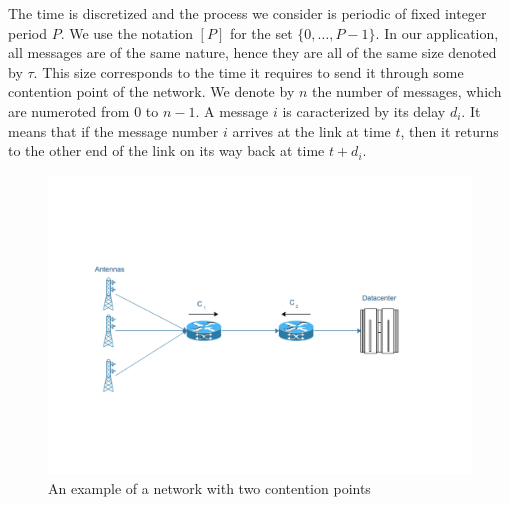 \documentclass[10pt, conference, letterpaper]{IEEEtran}
\begin{document}
The time is discretized and the process we consider is periodic of fixed integer period $P$. We use the notation $[P]$ for the set $\{0,\dots,P-1\}$. In our application, all messages are of the same nature, hence they are all of the same size denoted by $\tau$. This size corresponds to the time it requires to send it through some contention point of the network.
We denote by $n$ the number of messages, which are numeroted from $0$ to $n-1$. A message $i$ is caracterized by its delay $d_i$. It means that if the message number $i$ arrives at the link at time $t$, then it returns to the other end of the link on its way back at time $t + d_i$. 
\begin{center}
\begin{figure}
\centering
\includegraphics[scale=0.35]{network.pdf}
\centering
{}
\caption{An example of a network with two contention points}
\end{figure}
\end{center}
\end{document}

